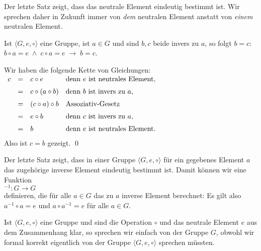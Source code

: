 \remark
Der letzte Satz zeigt, dass das neutrale Element eindeutig bestimmt ist.  Wir sprechen daher in Zukunft
immer von \emph{dem} neutralen Element anstatt von \emph{einem} neutralen Element.
\eox

\begin{Satz} \lb
  Ist $\langle G, e, \circ \rangle$ eine Gruppe, ist $a \in G$ und sind $b,c$ beide invers zu $a$, so folgt
  $b = c$:
  \\[0.2cm]
  \hspace*{1.3cm}
  $b \circ a = e \;\wedge\; c \circ a = e \;\rightarrow\; b = c$.
\end{Satz}

\proof
Wir haben die folgende Kette von Gleichungen:
\\[0.2cm]
\hspace*{1.3cm}
$
\begin{array}[t]{lcll}
  c & = & c \circ e & \mbox{denn $e$ ist neutrales Element,} \\[0.2cm]
    & = & c \circ (a \circ b) & \mbox{denn $b$ ist invers zu $a$,} \\[0.2cm]
    & = & (c \circ a) \circ b & \mbox{Assoziativ-Gesetz} \\[0.2cm]
    & = & e \circ b & \mbox{denn $c$ ist invers zu $a$,} \\[0.2cm]
    & = & b & \mbox{denn $e$ ist neutrales Element.} \\[0.2cm]
\end{array}
$
\\[0.2cm]
Also ist $c = b$ gezeigt. \qed


\remark Der letzte Satz zeigt, dass in einer Gruppe $\langle G, e, \circ \rangle$ f\"{u}r ein
gegebenes Element $a$ das zugeh\"{o}rige inverse Element eindeutig bestimmt ist.  Damit k\"{o}nnen
wir eine Funktion
\\[0.2cm]
\hspace*{1.3cm} $^{-1}: G \rightarrow G$
\\[0.2cm]
definieren, die f\"{u}r alle $a \in G$ das zu $a$ inverse Element berechnet: Es gilt also
\\[0.2cm]
\hspace*{1.3cm} $a^{-1} \circ a = e$ \quad und \quad $a \circ a^{-1} = e$ \quad f\"{u}r alle $a \in G$.
\eox

\remark
Ist $\langle G, e, \circ \rangle$ eine Gruppe und sind die Operation $\circ$ und das neutrale Element 
$e$ aus dem Zusammenhang klar, so sprechen wir einfach von der Gruppe $G$, obwohl wir formal korrekt
eigentlich von der Gruppe $\langle G, e, \circ \rangle$ sprechen m\"{u}ssten. 
\eox

